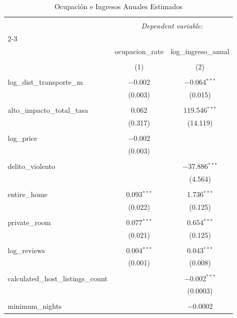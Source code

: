 
\begin{table}[!htbp] \centering 
  \caption{Ocupación e Ingresos Anuales Estimados} 
  \label{} 
\begin{tabular}{@{\extracolsep{5pt}}lcc} 
\\[-1.8ex]\hline 
\hline \\[-1.8ex] 
 & \multicolumn{2}{c}{\textit{Dependent variable:}} \\ 
\cline{2-3} 
\\[-1.8ex] & ocupacion\_rate & log\_ingreso\_anual \\ 
\\[-1.8ex] & (1) & (2)\\ 
\hline \\[-1.8ex] 
 log\_dist\_transporte\_m & $-$0.002 & $-$0.064$^{***}$ \\ 
  & (0.003) & (0.015) \\ 
  & & \\ 
 alto\_impacto\_total\_tasa & 0.062 & 119.546$^{***}$ \\ 
  & (0.317) & (14.119) \\ 
  & & \\ 
 log\_price & $-$0.002 &  \\ 
  & (0.003) &  \\ 
  & & \\ 
 delito\_violento &  & $-$37.886$^{***}$ \\ 
  &  & (4.564) \\ 
  & & \\ 
 entire\_home & 0.093$^{***}$ & 1.736$^{***}$ \\ 
  & (0.022) & (0.125) \\ 
  & & \\ 
 private\_room & 0.077$^{***}$ & 0.654$^{***}$ \\ 
  & (0.021) & (0.125) \\ 
  & & \\ 
 log\_reviews & 0.004$^{***}$ & 0.043$^{***}$ \\ 
  & (0.001) & (0.008) \\ 
  & & \\ 
 calculated\_host\_listings\_count &  & $-$0.002$^{***}$ \\ 
  &  & (0.0003) \\ 
  & & \\ 
 minimum\_nights &  & $-$0.0002 \\ 

\end{tabular}
\end{table}

